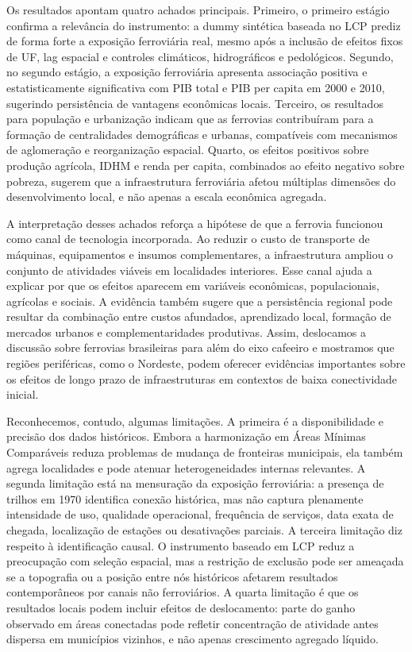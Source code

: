 \documentclass[12pt,a4paper]{article}
\begin{document}
Os resultados apontam quatro achados principais. Primeiro, o primeiro estágio confirma a relevância do instrumento: a dummy sintética baseada no LCP prediz de forma forte a exposição ferroviária real, mesmo após a inclusão de efeitos fixos de UF, lag espacial e controles climáticos, hidrográficos e pedológicos. Segundo, no segundo estágio, a exposição ferroviária apresenta associação positiva e estatisticamente significativa com PIB total e PIB per capita em 2000 e 2010, sugerindo persistência de vantagens econômicas locais. Terceiro, os resultados para população e urbanização indicam que as ferrovias contribuíram para a formação de centralidades demográficas e urbanas, compatíveis com mecanismos de aglomeração e reorganização espacial. Quarto, os efeitos positivos sobre produção agrícola, IDHM e renda per capita, combinados ao efeito negativo sobre pobreza, sugerem que a infraestrutura ferroviária afetou múltiplas dimensões do desenvolvimento local, e não apenas a escala econômica agregada.

A interpretação desses achados reforça a hipótese de que a ferrovia funcionou como canal de tecnologia incorporada. Ao reduzir o custo de transporte de máquinas, equipamentos e insumos complementares, a infraestrutura ampliou o conjunto de atividades viáveis em localidades interiores. Esse canal ajuda a explicar por que os efeitos aparecem em variáveis econômicas, populacionais, agrícolas e sociais. A evidência também sugere que a persistência regional pode resultar da combinação entre custos afundados, aprendizado local, formação de mercados urbanos e complementaridades produtivas. Assim, deslocamos a discussão sobre ferrovias brasileiras para além do eixo cafeeiro e mostramos que regiões periféricas, como o Nordeste, podem oferecer evidências importantes sobre os efeitos de longo prazo de infraestruturas em contextos de baixa conectividade inicial.

Reconhecemos, contudo, algumas limitações. A primeira é a disponibilidade e precisão dos dados históricos. Embora a harmonização em Áreas Mínimas Comparáveis reduza problemas de mudança de fronteiras municipais, ela também agrega localidades e pode atenuar heterogeneidades internas relevantes. A segunda limitação está na mensuração da exposição ferroviária: a presença de trilhos em 1970 identifica conexão histórica, mas não captura plenamente intensidade de uso, qualidade operacional, frequência de serviços, data exata de chegada, localização de estações ou desativações parciais. A terceira limitação diz respeito à identificação causal. O instrumento baseado em LCP reduz a preocupação com seleção espacial, mas a restrição de exclusão pode ser ameaçada se a topografia ou a posição entre nós históricos afetarem resultados contemporâneos por canais não ferroviários. A quarta limitação é que os resultados locais podem incluir efeitos de deslocamento: parte do ganho observado em áreas conectadas pode refletir concentração de atividade antes dispersa em municípios vizinhos, e não apenas crescimento agregado líquido.
\end{document}
